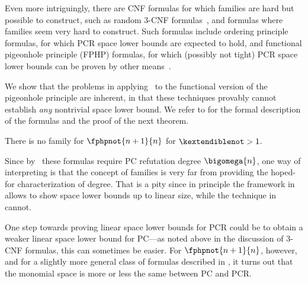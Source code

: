 \documentclass{toc}
\begin{document}
Even more intriguingly, there are CNF formulas for which
\kextendibleNok families are hard but possible to construct, such as
random $3$-CNF formulas~\cite{BBGHMW17SpaceProofCplx}, and formulas
where \kextendibleNok families seem very hard to construct. Such
formulas include ordering principle formulas, for which PCR space
lower bounds are expected to hold, and functional pigeonhole principle
(FPHP) formulas, for which (possibly not tight) PCR space lower bounds
can be proven by other means~\cite{GKT19SpaceWidth}.

We show that the problems in applying~%
\cite{BG15Framework}
to the functional version of the pigeonhole principle are inherent, 
in that these techniques provably cannot establish
%
\emph{any} nontrivial
space lower bound.
%
We refer to
%
  for the formal description of the formulas
  and
%
%
%
  the proof of the 
  next theorem.

\begin{theorem}
  \label{th:no-kextendible}
  There is no \kextendible family for
  $\fphpnot{n+1}{n}$ 
%
  for
  $\kextendiblenot>1$. 
\end{theorem}
  
%
%
%
%
%
%
%
%
%
%
%
%
%
%
%
%
%
%
%
%
%
%
%
%
%
%
%
%
%
%
%

Since by~\cite{Razborov98LowerBound,MN15GeneralizedMethodDegree}
these formulas
require PC refutation
degree $\bigomega{n}$, one way of interpreting
 is that the concept of \kextendible families
is very far from providing the hoped-for characterization of degree.
%
That is a pity since in principle the framework
in~\cite{BG15Framework} allows to show space lower bounds up to linear
size, while the technique in~\cite{GKT19SpaceWidth} cannot.

One step towards proving linear space lower bounds for PCR could be to
obtain a weaker linear space lower bound for PC---as noted above in
the discussion of \mbox{$3$-CNF} formulas, this can sometimes
be easier.
%
For
$\fphpnot{n+1}{n}$,
%
however,
and for a slightly more general class of formulas
described in
 ,
%
%
%
%
it turns out that the monomial space is more or less the same
between PC and PCR.

%

\end{document}
